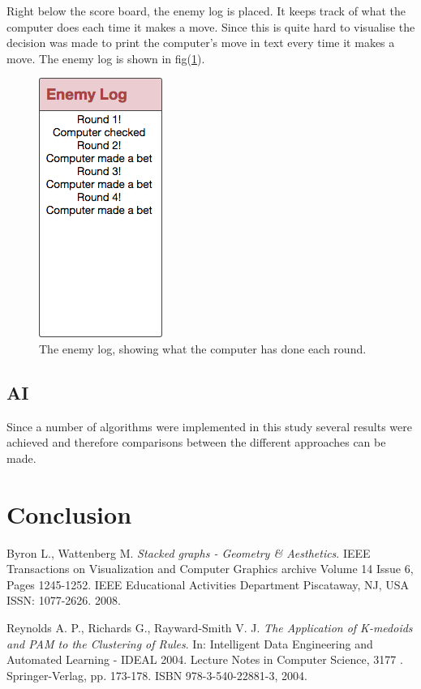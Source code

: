 \documentclass[journal]{vgtc}                %
\begin{document}
Right below the score board, the enemy log is placed. It keeps track of what the computer does each time it makes a move. Since this is quite hard to visualise the decision was made to print the computer's move in text every time it makes a move. The enemy log is shown in fig(\ref{fig:ui3}).
\begin{figure}[here]
  \begin{center}
    \includegraphics[scale=0.50]{img/ui4.png}
    \caption{\label{fig:ui3} The enemy log, showing what the computer has done each round.}
  \end{center}
\end{figure}

\subsection{AI}
Since a number of algorithms were implemented in this study several results were achieved and therefore comparisons between the different approaches can be made. 

\section{Conclusion}



\begin{thebibliography}{9}

  Byron L., Wattenberg M.
  \emph{Stacked graphs - Geometry \& Aesthetics}.
  IEEE Transactions on Visualization and Computer Graphics archive
Volume 14 Issue 6,
Pages 1245-1252. IEEE Educational Activities Department Piscataway, NJ, USA
ISSN: 1077-2626.
  2008.

  Reynolds A. P., Richards G., Rayward-Smith V. J.
  \emph{The Application of K-medoids and PAM to the Clustering of Rules}.
  In: Intelligent Data Engineering and Automated Learning - IDEAL 2004. Lecture Notes in Computer Science, 3177 . Springer-Verlag, pp. 173-178. ISBN 978-3-540-22881-3,
  2004.

\end{thebibliography}
\end{document}
